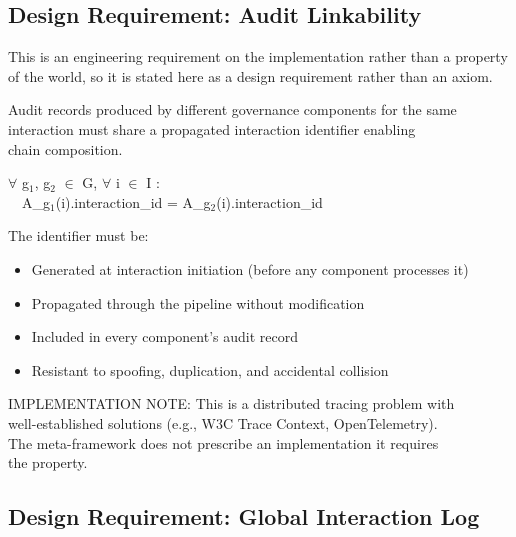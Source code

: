 \subsection{Design Requirement: Audit Linkability}


This is an engineering requirement on the implementation rather than a property of the world, so it is stated here as a design requirement rather than an axiom.

\begin{creq}
\begin{claddisp}
Audit records produced by different governance components for the same\\
interaction must share a propagated interaction identifier enabling\\
chain composition.\\
\end{claddisp}
\begin{claddisp}
$\forall$ g$_1$, g$_2$ $\in$ G, $\forall$ i $\in$ I :\\
~~A\_g$_1$(i).interaction\_id = A\_g$_2$(i).interaction\_id\\
\end{claddisp}
The identifier must be:
\begin{itemize}
  \item Generated at interaction initiation (before any component processes it)
  \item Propagated through the pipeline without modification
  \item Included in every component's audit record
  \item Resistant to spoofing, duplication, and accidental collision
\end{itemize}

\begin{claddisp}
IMPLEMENTATION NOTE: This is a distributed tracing problem with\\
well-established solutions (e.g., W3C Trace Context, OpenTelemetry).\\
The meta-framework does not prescribe an implementation \textemdash{} it requires\\
the property.\\
\end{claddisp}
\end{creq}


\subsection{Design Requirement: Global Interaction Log}


